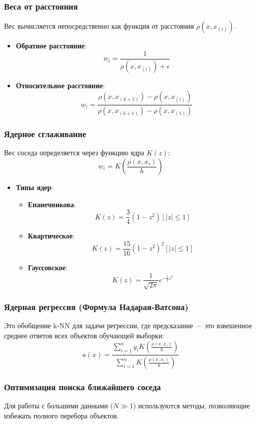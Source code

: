 \documentclass[12pt]{article}
\begin{document}
\subsubsection{Веса от расстояния}
Вес вычисляется непосредственно как функция от расстояния $\rho(x, x_{(i)})$.
\begin{itemize}
    \item \textbf{Обратное расстояние}: 
    \[ w_i = \frac{1}{\rho(x, x_{(i)}) + \epsilon} \]
    \item \textbf{Относительное расстояние}: 
    \[ w_i = \frac{\rho(x, x_{(k+1)}) - \rho(x, x_{(i)})}{\rho(x, x_{(k+1)}) - \rho(x, x_{(1)})} \]
\end{itemize}

\subsubsection{Ядерное сглаживание}
Вес соседа определяется через функцию ядра $K(z)$:
\[ w_i = K\left(\frac{\rho(x, x_i)}{h}\right) \]

\begin{itemize}
    \item \textbf{Типы ядер}:
    \begin{itemize}
        \item \textbf{Епанечникова}: \[ K(z) = \frac{3}{4} (1 - z^2) [|z| \le 1] \]
        \item \textbf{Квартическое}: \[ K(z) = \frac{15}{16} (1 - z^2)^2 [|z| \le 1] \]
        \item \textbf{Гауссовское}: \[ K(z) = \frac{1}{\sqrt{2\pi}} e^{-\frac{1}{2}z^2} \]
    \end{itemize}
\end{itemize}

\subsubsection{Ядерная регрессия (Формула Надарая-Ватсона)}
Это обобщение k-NN для задачи регрессии, где предсказание — это взвешенное среднее ответов всех объектов обучающей выборки:
\[ a(x) = \frac{\sum_{i=1}^n y_i K\left(\frac{\rho(x, x_i)}{h}\right)}{\sum_{i=1}^n K\left(\frac{\rho(x, x_i)}{h}\right)} \]

\subsubsection{Оптимизация поиска ближайшего соседа}
Для работы с большими данными ($N \gg 1$) используются методы, позволяющие избежать полного перебора объектов.
\end{document}
